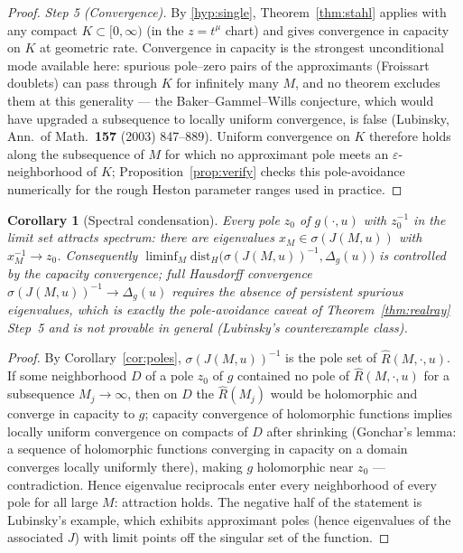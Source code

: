 \documentclass[11pt]{article}
\newtheorem{corollary}[theorem]{Corollary}
\theoremstyle{definition}
\begin{document}
\begin{proof}
\emph{Step 5 (Convergence).}
By \ref{hyp:single}, Theorem~\ref{thm:stahl} applies with any
compact $K \subset [0,\infty)$ (in the $z = t^{\mu}$ chart) and gives
convergence in capacity on $K$ at geometric rate. Convergence in
capacity is the strongest unconditional mode available here: spurious
pole--zero pairs of the approximants (Froissart doublets) can pass
through $K$ for infinitely many $M$, and no theorem excludes them at
this generality --- the Baker--Gammel--Wills conjecture, which would
have upgraded a subsequence to locally uniform convergence, is false
(Lubinsky, Ann.\ of Math.\ \textbf{157} (2003) 847--889). Uniform
convergence on $K$ therefore holds along the subsequence of $M$ for
which no approximant pole meets an $\varepsilon$-neighborhood of
$K$; Proposition~\ref{prop:verify} checks this pole-avoidance
numerically for the rough Heston parameter ranges used in practice.
\end{proof}

\begin{corollary}[Spectral condensation]\label{cor:spectralcond}
Every pole $z_{0}$ of $g(\cdot,u)$ with $z_{0}^{-1}$ in the limit
set attracts spectrum: there are eigenvalues
$x_{M} \in \sigma(J(M,u))$ with $x_{M}^{-1} \to z_{0}$. Consequently
$\liminf_{M} \mathrm{dist}_{H}\bigl(\sigma(J(M,u))^{-1},
\Delta_{g}(u)\bigr)$ is controlled by the capacity convergence;
full Hausdorff convergence
$\sigma(J(M,u))^{-1} \to \Delta_{g}(u)$ requires the absence of
persistent spurious eigenvalues, which is exactly the
pole-avoidance caveat of Theorem~\ref{thm:realray} Step~5 and is not
provable in general (Lubinsky's counterexample class).
\end{corollary}

\begin{proof}
By Corollary~\ref{cor:poles}, $\sigma(J(M,u))^{-1}$ is the pole set
of $\hat R(M,\cdot,u)$. If some neighborhood $D$ of a pole $z_{0}$
of $g$ contained no pole of $\hat R(M,\cdot,u)$ for a subsequence
$M_{j} \to \infty$, then on $D$ the $\hat R(M_{j})$ would be
holomorphic and converge in capacity to $g$; capacity convergence of
holomorphic functions implies locally uniform convergence on
compacts of $D$ after shrinking (Gonchar's lemma: a sequence of
holomorphic functions converging in capacity on a domain converges
locally uniformly there), making $g$ holomorphic near $z_{0}$ ---
contradiction. Hence eigenvalue reciprocals enter every neighborhood
of every pole for all large $M$: attraction holds. The negative
half of the statement is Lubinsky's example, which exhibits
approximant poles (hence eigenvalues of the associated $J$) with
limit points off the singular set of the function.
\end{proof}
\end{document}
